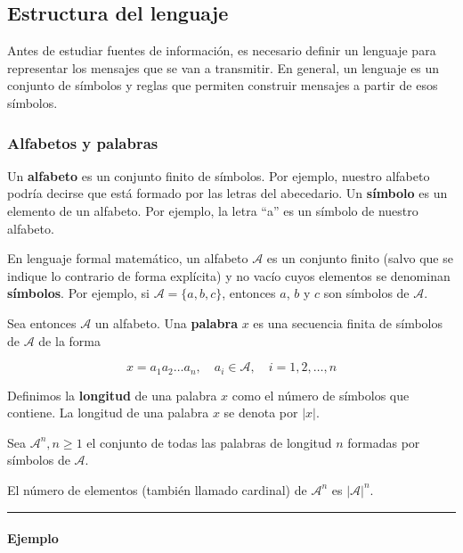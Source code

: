 \subsection{Estructura del lenguaje}\label{estructura-del-lenguaje}

Antes de estudiar fuentes de información, es necesario definir un
lenguaje para representar los mensajes que se van a transmitir. En
general, un lenguaje es un conjunto de símbolos y reglas que permiten
construir mensajes a partir de esos símbolos.

\subsubsection{Alfabetos y palabras}\label{alfabetos-y-palabras}

Un \textbf{alfabeto} es un conjunto finito de símbolos. Por ejemplo,
nuestro alfabeto podría decirse que está formado por las letras del
abecedario. Un \textbf{símbolo} es un elemento de un alfabeto. Por
ejemplo, la letra ``a'' es un símbolo de nuestro alfabeto.

En lenguaje formal matemático, un alfabeto \(\mathcal{A}\) es un
conjunto finito (salvo que se indique lo contrario de forma explícita) y
no vacío cuyos elementos se denominan \textbf{símbolos}. Por ejemplo, si
\(\mathcal{A} = \{a, b, c\}\), entonces \(a\), \(b\) y \(c\) son
símbolos de \(\mathcal{A}\).

Sea entonces \(\mathcal{A}\) un alfabeto. Una \textbf{palabra} \(x\) es
una secuencia finita de símbolos de \(\mathcal{A}\) de la forma

\[
x=a_1a_2\dots a_n, \quad a_i \in \mathcal{A}, \quad i=1,2,\dots,n
\]

Definimos la \textbf{longitud} de una palabra \(x\) como el número de
símbolos que contiene. La longitud de una palabra \(x\) se denota por
\(|x|\).

Sea \(\mathcal{A}^n,n\geq 1\) el conjunto de todas las palabras de
longitud \(n\) formadas por símbolos de \(\mathcal{A}\).

El número de elementos (también llamado cardinal) de \(\mathcal{A}^n\)
es \(|\mathcal{A}|^n\).

\begin{center}\rule{0.5\linewidth}{0.5pt}\end{center}

\paragraph{Ejemplo}\label{ejemplo-estructura-del-lenguaje}

